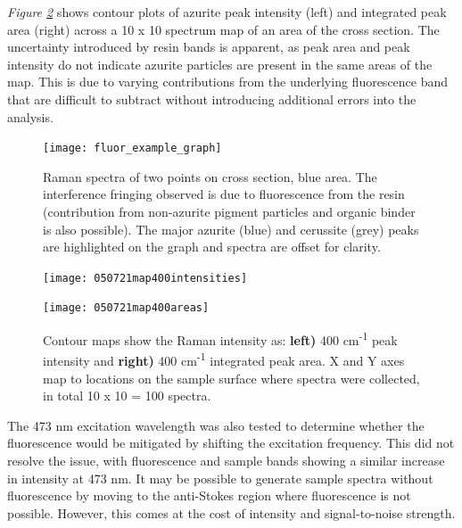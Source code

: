 \textit{Figure \ref{fig:contours_xsection}} shows contour plots of azurite peak intensity (left) and integrated peak area (right) across a 10 x 10 spectrum map of an area of the cross section. The uncertainty introduced by resin bands is apparent, as peak area and peak intensity do not indicate azurite particles are present in the same areas of the map. This is due to varying contributions from the underlying fluorescence band that are difficult to subtract without introducing additional errors into the analysis.

\begin{figure}[H]
\centering
  \texttt{[image: fluor\_example\_graph]}
\caption[Raman spectra of cross section]{Raman spectra of two points on cross section, blue area. The interference fringing observed is due to fluorescence from the resin (contribution from non-azurite pigment particles and organic binder is also possible). The major azurite (blue) and cerussite (grey) peaks are highlighted on the graph and spectra are offset for clarity.}
\label{fig:fluor_example_graph}
\end{figure}


\begin{figure}[H]
\centering
\begin{minipage}{.45\textwidth}
  \centering
  \texttt{[image: 050721map400intensities]}
\end{minipage}
\begin{minipage}{.45\textwidth}
  \centering
  \texttt{[image: 050721map400areas]}
\end{minipage}
\caption[Contour maps, azurite Raman intensity in cross section]{Contour maps show the Raman intensity as: \textbf{left)} 400 cm\textsuperscript{-1} peak intensity and \textbf{right)} 400 cm\textsuperscript{-1} integrated peak area. X and Y axes map to locations on the sample surface where spectra were collected, in total 10 x 10 = 100 spectra.}
\label{fig:contours_xsection}
\end{figure}

The 473 nm excitation wavelength was also tested to determine whether the fluorescence would be mitigated by shifting the excitation frequency. This did not resolve the issue, with fluorescence and sample bands showing a similar increase in intensity at 473 nm. It may be possible to generate sample spectra without fluorescence by moving to the anti-Stokes region where fluorescence is not possible. However, this comes at the cost of intensity and signal-to-noise strength.


